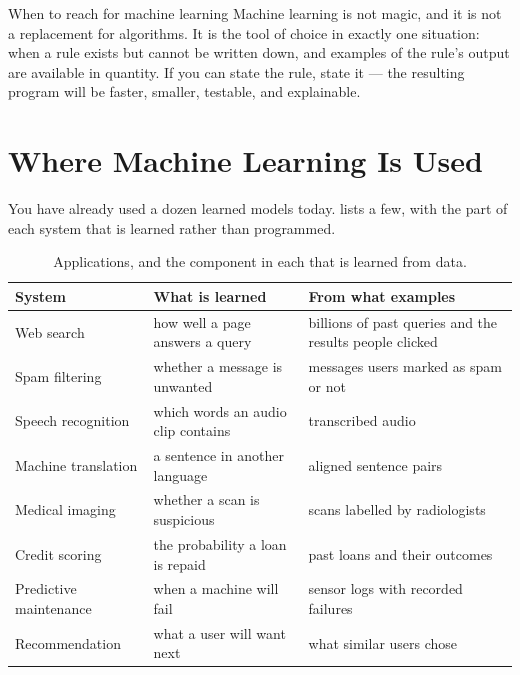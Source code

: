 \begin{keyinsight}{When to reach for machine learning}
Machine learning is not magic, and it is not a replacement for algorithms. It is
the tool of choice in exactly one situation: when a rule exists but cannot be
written down, and examples of the rule's output are available in quantity. If
you can state the rule, state it --- the resulting program will be faster,
smaller, testable, and explainable.
\end{keyinsight}

\section{Where Machine Learning Is Used}
\label{sec:applications}

You have already used a dozen learned models today. 
lists a few, with the part of each system that is learned rather than
programmed.

\begin{table}[htbp]
  \centering
  \small
  \renewcommand{\arraystretch}{1.25}
  \begin{tabular}{@{}L{3.3cm}L{3.9cm}L{4.0cm}@{}}
    \toprule
    \textbf{System} & \textbf{What is learned} & \textbf{From what examples}\\
    \midrule
    Web search        & how well a page answers a query & billions of past
                        queries and the results people clicked\\
    Spam filtering    & whether a message is unwanted    & messages users marked
                        as spam or not\\
    Speech recognition& which words an audio clip contains & transcribed audio\\
    Machine translation & a sentence in another language & aligned sentence
                        pairs\\
    Medical imaging   & whether a scan is suspicious     & scans labelled by
                        radiologists\\
    Credit scoring    & the probability a loan is repaid & past loans and their
                        outcomes\\
    Predictive maintenance & when a machine will fail    & sensor logs with
                        recorded failures\\
    Recommendation    & what a user will want next       & what similar users
                        chose\\
    \bottomrule
  \end{tabular}
  \caption{Applications, and the component in each that is learned from data.}
  \label{tab:applications}
\end{table}


